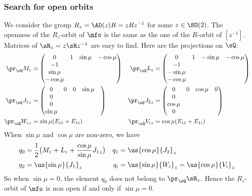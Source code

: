 \subsubsection{Search for open orbits}

We consider the group $R_z=\AD(z)R=zRz^{-1}$ for some $z\in \SO(2)$. The openness of the $R_z$-orbit of $\mfo$ is the same as the one of the $R$-orbit of $[z^{-1}]$. Matrices of $\sR_z=z\sR z^{-1}$ are easy to find. Here are the projections on $\sQ$: 
\begin{subequations}
\begin{align}
\pr_{\sQ} M_z&=
\begin{pmatrix}
0&1&\sin\mu&-\cos\mu\\
-1\\
\sin\mu\\
-\cos\mu
\end{pmatrix}
&\pr_{\sQ} L_z&=
\begin{pmatrix}
0&1&-\sin\mu&-\cos\mu\\
-1\\-\sin\mu\\
-\cos\mu
\end{pmatrix}\\
 \pr_{\sQ} {J_1}_z&=
\begin{pmatrix}
0&0&0&\sin\mu&\\
0\\
0\\
\sin\mu
\end{pmatrix}
&\pr_{\sQ} {J_2}_z&=
\begin{pmatrix}
0&0&\cos\mu&0\\
0\\
\cos\mu\\
0
\end{pmatrix}\\
 \pr_{\sQ} {W_i}_z&=\sin\mu(E_{i1}+E_{1i})&\pr_{\sQ} {V_i}_z&=\cos\mu(E_{i1}+E_{1i})
\end{align}
\end{subequations}
When $\sin\mu$ and $\cos\mu$ are non-zero, we have
\begin{subequations}
\begin{align}
q_0&=\frac{1}{2}\big(M_z+L_z+\frac{\cos\mu}{\sin\mu}{J_1}_z\big)&q_1&=\us{\cos\mu}{J_2}_z\\
q_2&=\us{\sin\mu}{J_1}_z&q_i&=\us{\sin\mu}{W_i}_z=\us{\cos\mu}{V_i}_z
\end{align}
\end{subequations}
 So when $\sin\mu=0$, the element $q_{0}$ does not belong to $\pr_{\sQ}\sR_{z}$. Hence the $R_z$-orbit of $\mfo$ is non open if and only if $\sin \mu=0$.

